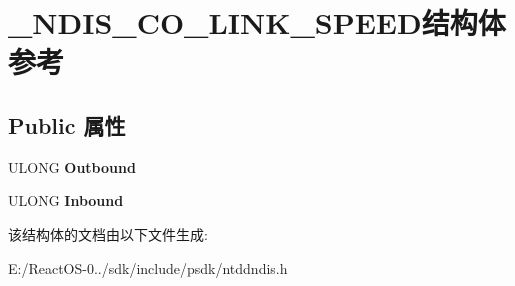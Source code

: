 \hypertarget{struct___n_d_i_s___c_o___l_i_n_k___s_p_e_e_d}{}\section{\+\_\+\+N\+D\+I\+S\+\_\+\+C\+O\+\_\+\+L\+I\+N\+K\+\_\+\+S\+P\+E\+E\+D结构体 参考}
\label{struct___n_d_i_s___c_o___l_i_n_k___s_p_e_e_d}
\subsection*{Public 属性}
\begin{DoxyCompactItemize}
\item 
\mbox{\label{struct___n_d_i_s___c_o___l_i_n_k___s_p_e_e_d_a7da76fe99aa543a6b93f038f05ac8058}} 
U\+L\+O\+NG {\bfseries Outbound}
\item 
\mbox{\label{struct___n_d_i_s___c_o___l_i_n_k___s_p_e_e_d_ac89f7770ec8ee78c99c1e0285cd4d8e2}} 
U\+L\+O\+NG {\bfseries Inbound}
\end{DoxyCompactItemize}


该结构体的文档由以下文件生成\+:\begin{DoxyCompactItemize}
\item 
E\+:/\+React\+O\+S-\/0../sdk/include/psdk/ntddndis.\+h\end{DoxyCompactItemize}
